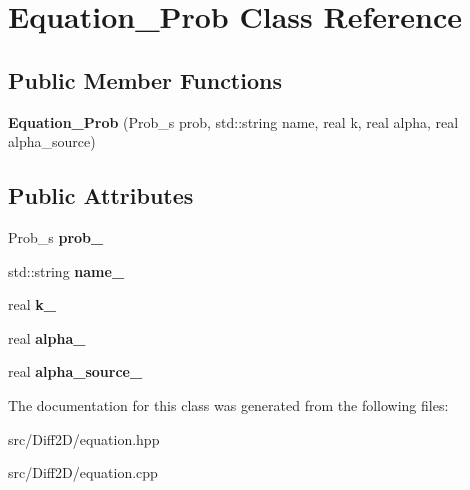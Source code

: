 \hypertarget{classEquation__Prob}{
\section{Equation\_\-Prob Class Reference}
\label{classEquation__Prob}
}
\subsection*{Public Member Functions}
\begin{DoxyCompactItemize}
\item 
\hypertarget{classEquation__Prob_a8eda60c6fe1e289ac5384cdf530cb47b}{
{\bfseries Equation\_\-Prob} (Prob\_\-s prob, std::string name, real k, real alpha, real alpha\_\-source)}
\label{classEquation__Prob_a8eda60c6fe1e289ac5384cdf530cb47b}

\end{DoxyCompactItemize}
\subsection*{Public Attributes}
\begin{DoxyCompactItemize}
\item 
\hypertarget{classEquation__Prob_a8761e4cfb7c9c934d1827a91625d7643}{
Prob\_\-s {\bfseries prob\_\-}}
\label{classEquation__Prob_a8761e4cfb7c9c934d1827a91625d7643}

\item 
\hypertarget{classEquation__Prob_af9c78d17a5b69f44175e95cef57c05d3}{
std::string {\bfseries name\_\-}}
\label{classEquation__Prob_af9c78d17a5b69f44175e95cef57c05d3}

\item 
\hypertarget{classEquation__Prob_add8db541a0ff4a402b95e2a70a3ad7a8}{
real {\bfseries k\_\-}}
\label{classEquation__Prob_add8db541a0ff4a402b95e2a70a3ad7a8}

\item 
\hypertarget{classEquation__Prob_ab8c2b9f46d6d9393c6556d0e734aae61}{
real {\bfseries alpha\_\-}}
\label{classEquation__Prob_ab8c2b9f46d6d9393c6556d0e734aae61}

\item 
\hypertarget{classEquation__Prob_aeb3f0d6aa0ffbbd16bc0866f177ec13e}{
real {\bfseries alpha\_\-source\_\-}}
\label{classEquation__Prob_aeb3f0d6aa0ffbbd16bc0866f177ec13e}

\end{DoxyCompactItemize}


The documentation for this class was generated from the following files:\begin{DoxyCompactItemize}
\item 
src/Diff2D/equation.hpp\item 
src/Diff2D/equation.cpp\end{DoxyCompactItemize}
